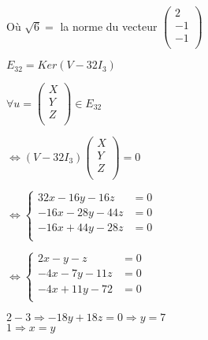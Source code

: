 \documentclass[a4paper, 12pt]{article}
\begin{document}
\begin{flushleft}
Où $\sqrt{6} = $ la norme du vecteur
$
\begin{pmatrix}
2 \\
-1 \\
-1 \\
\end{pmatrix}
$
\end{flushleft}

\begin{center}
$E_{32} = Ker(V - 32I_3)$
\end{center}

\begin{center}
$\forall u = 
\begin{pmatrix}
X \\
Y \\
Z \\
\end{pmatrix}
\in E_ {32}
$
\end{center}

\begin{center}
$\Leftrightarrow (V - 32I_3)
\begin{pmatrix}
X \\
Y \\
Z \\
\end{pmatrix}
 = 0
$
\end{center}

\begin{center}
$
\Leftrightarrow
\left \{
\begin{aligned}
32x - 16y - 16z &= 0 \\
-16x - 28y - 44z &= 0 \\
-16x + 44y - 28z &= 0 \\
\end{aligned}
\right .
$
\end{center}

\begin{center}
$
\Leftrightarrow
\left \{
\begin{aligned}
2x - y - z &= 0 \\
-4x - 7y - 11z &= 0 \\
-4x + 11y - 72 &= 0 \\
\end{aligned}
\right .
$
\end{center}

\begin{center}
$2 - 3 \Rightarrow - 18y + 18z = 0 \Rightarrow \boxed{y = 7}$ \\
$1 \Rightarrow \boxed{x = y}$
\end{center}
\end{document}

